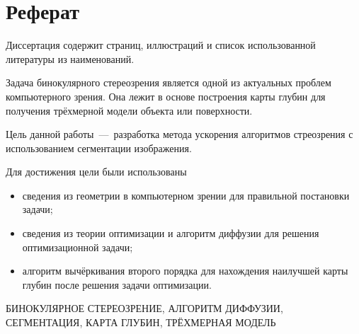 \chapter*{Реферат}

Диссертация содержит \pageref{LastPage} страниц,
 иллюстраций и список использованной литературы из
 наименований.

Задача бинокулярного стереозрения
является одной из актуальных проблем компьютерного зрения.
Она лежит в основе построения карты глубин для получения трёхмерной
модели объекта или поверхности.

Цель данной работы~---~разработка метода ускорения
алгоритмов стреозрения с использованием сегментации изображения.

Для достижения цели были использованы
\begin{itemize}
  \item сведения из геометрии
        в компьютерном зрении для правильной постановки задачи;
  \item сведения из теории оптимизации и
        алгоритм диффузии для решения оптимизационной задачи;
  \item алгоритм вычёркивания второго порядка для нахождения наилучшей
  карты глубин после решения задачи оптимизации.
\end{itemize}

\MakeUppercase{бинокулярное стереозрение,
               алгоритм диффузии,
               сегментация,
               карта глубин,
               трёхмерная модель}

